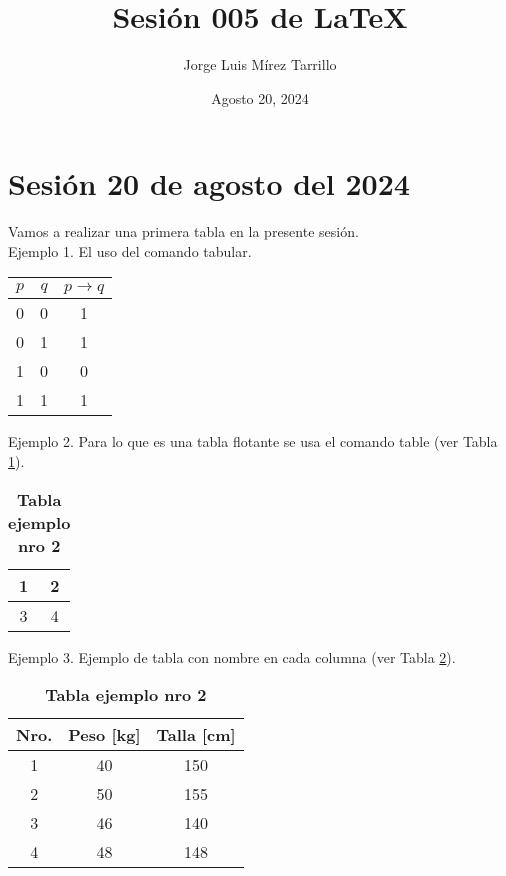 \documentclass{article}
\title{Sesión 005 de LaTeX}
\author{Jorge Luis Mírez Tarrillo}
\date{Agosto 20, 2024}
\begin{document}
\maketitle

\section*{Sesión 20 de agosto del 2024}

Vamos a realizar una primera tabla en la presente sesión. \\

Ejemplo 1. El uso del comando tabular.\\

\begin{tabular}{|c|c|c|} \hline  
    $p$ & $q$ & $p \rightarrow q$  \\ \hline
    0 & 0 & 1  \\ 
    0 & 1 & 1  \\ \cline{1-2}
    1 & 0 & 0  \\
    1 & 1 & 1  \\ \hline
\end{tabular} 
\newline

Ejemplo 2. Para lo que es una tabla flotante se usa el comando table (ver Tabla \ref{tab:01}).

\begin{table}[h]
    \centering
    \begin{tabular}{|c|c|} \hline
        1 & 2 \\ \hline
        3 & 4 \\ \hline
    \end{tabular}
    \caption{\textbf{Tabla ejemplo nro 2}}
    \label{tab:01}
\end{table}

Ejemplo 3. Ejemplo de tabla con nombre en cada columna (ver Tabla \ref{tab:02}).

\begin{table}[h]
    \centering
    \begin{tabular}{|c|c|c|} \hline
        \textbf{Nro.} & \textbf{Peso [kg]} & \textbf{Talla [cm]} \\ \hline
        1 & 40 & 150 \\ \hline
        2 & 50 & 155 \\ \hline
        3 & 46 & 140 \\ \hline
        4 & 48 & 148 \\ \hline
    \end{tabular}
    \caption{\textbf{Tabla ejemplo nro 2}}
    \label{tab:02}
\end{table}
\end{document}

